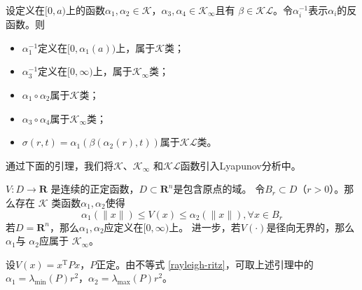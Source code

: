 \begin{lemma}
  设定义在$[0,a)$上的函数$\alpha_{1},\alpha_{2}\in\mathcal{K}$，$\alpha_{3},\alpha_{4}\in\mathcal{K}_{\infty}$且有
  $\beta\in\mathcal{KL}$。令$\alpha_{i}^{-1}$表示$\alpha_{i}$的反函数。则
  \begin{itemize}[leftmargin=1em]
    \item $\alpha_{1}^{-1}$定义在$[0,\alpha_{1}(a))$上，属于$\mathcal{K}$类；
    \item $\alpha_{3}^{-1}$定义在$[0,\infty)$上，属于$\mathcal{K}_\infty$类；
    \item $\alpha_{1} \circ\alpha_{2}$属于$\mathcal{K}$类；
    \item $\alpha_{3} \circ\alpha_{4}$属于$\mathcal{K}_\infty$类；
    \item $\sigma(r,t)=\alpha_{1}(\beta(\alpha_{2}(r),t)) $属于$\mathcal{K}\mathcal{L}$类。
  \end{itemize}
\end{lemma}

通过下面的引理，我们将$\mathcal{K}$、$\mathcal{K}_\infty$ 和$\mathcal{K}\mathcal{L}$函数引入Lyapunov分析中。

\begin{lemma}
  $V : D \rightarrow \mathbf{R}$ 是连续的正定函数，$D\subset\mathbf{R}^n$是包含原点的域。
  令$B_r\subset D$（$r>0$）。那么存在
  $\mathcal{K}$ 类函数$\alpha_1,\alpha_2$使得
  \[ \alpha_1 (\| x \|) \leq V (x) \leq \alpha_2 (\| x \|), \forall x \in B_r \]
  若$D =\mathbf{R}^n$，那么$\alpha_1,\alpha_2$应定义在$[0,\infty)$上。
  进一步，若$V (\cdot)$是径向无界的，那么 $\alpha_1$与 $\alpha_2$应属于 $\mathcal{K}_{\infty}$。
\end{lemma}

\begin{example}
  设$V (x) = x^\mathrm{T} P  x$，$P$正定。由不等式 \ref{rayleigh-ritz}，可取上述引理中的$\alpha_1=\lambda_{\min} (P)r^2$，$\alpha_2=\lambda_{\max} (P)r^2$。
\end{example}


